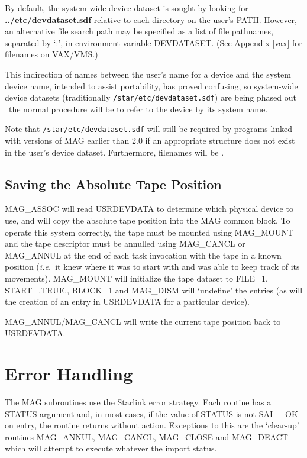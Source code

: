 By default, the system-wide device dataset
is sought by looking for {\bf ../etc/devdataset.sdf} relative to each
directory on the user's PATH. However, an alternative file search path may be
specified as a list of file pathnames, separated by `:', in environment
variable DEVDATASET. (See Appendix \ref{vax} for filenames on VAX/VMS.)

This indirection of names between the user's name for a device and the
system device name, intended to assist portability, has proved confusing,
so system-wide device datasets (traditionally {\tt /star/etc/devdataset.sdf})
are being phased out \dash\ the normal procedure will be to refer to the device
by its system name.

Note that {\tt /star/etc/devdataset.sdf} will still be required by programs
linked with versions of MAG earlier than 2.0 if an appropriate structure does
not exist in the user's device dataset. Furthermore, filenames will be
.

\subsection{Saving the Absolute Tape Position}
MAG\_ASSOC will read USRDEVDATA to determine which physical device to use, and
will copy the absolute tape position into the MAG common block.
To operate this system correctly, the tape must be mounted using MAG\_MOUNT
and the tape descriptor must be annulled using MAG\_CANCL or MAG\_ANNUL at the
end of each task invocation with the tape in a known position ({\em i.e.}\ it knew
where it was to start with and was able to keep track of its movements).
MAG\_MOUNT will initialize the tape dataset to FILE=1, START=.TRUE., BLOCK=1
and MAG\_DISM will `undefine' the entries (as will the creation of an entry
in USRDEVDATA for a particular device).

MAG\_ANNUL/MAG\_CANCL will write the current tape position back to USRDEVDATA.

\section{Error Handling}

The MAG subroutines use the Starlink error strategy. Each routine has a STATUS
argument and, in most cases, if the value of STATUS is not SAI\_\_OK on entry,
the routine returns without action. Exceptions to this are the `clear-up'
routines MAG\_ANNUL, MAG\_CANCL, MAG\_CLOSE and MAG\_DEACT which will attempt
to execute whatever the import status.

